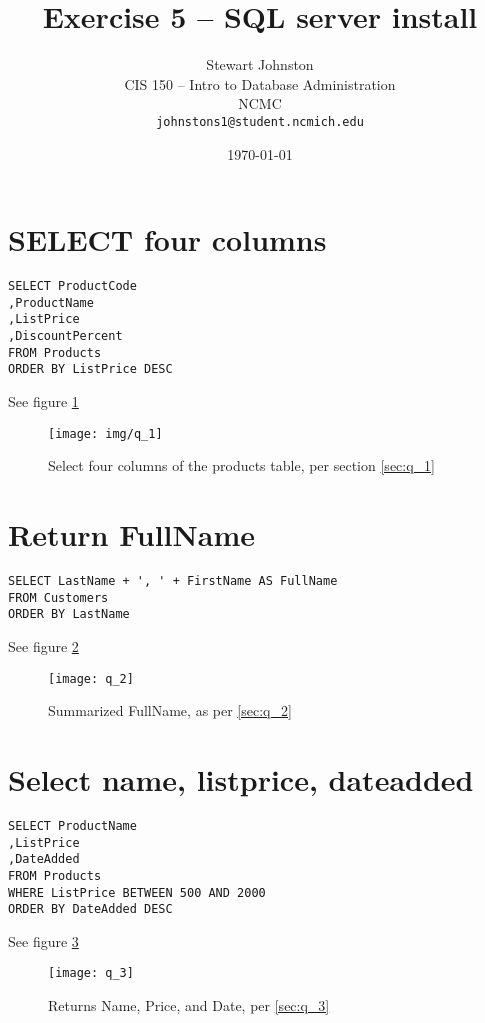 \documentclass{article}
\title{Exercise 5 -- SQL server install}
\author{Stewart Johnston\\
  {CIS 150 -- Intro to Database Administration}\\
  {NCMC}\\
  {\texttt{johnstons1@student.ncmich.edu}}
}
\date{\today}
\begin{document}
\maketitle
\lstset{language=SQL}

\section{SELECT four columns}

\begin{lstlisting}
SELECT ProductCode
,ProductName
,ListPrice
,DiscountPercent
FROM Products
ORDER BY ListPrice DESC
\end{lstlisting}\label{sec:q_1}
See figure \ref{fig:q_1}

\begin{figure}[H]\centering
	\caption{Select four columns of the products table, per section
	\ref{sec:q_1}}
	\texttt{[image: img/q\_1]}
	\label{fig:q_1}
\end{figure}

\section{Return FullName}

\begin{lstlisting}
SELECT LastName + ', ' + FirstName AS FullName
FROM Customers
ORDER BY LastName
\end{lstlisting}\label{sec:q_2}
See figure \ref{fig:q_2}

\begin{figure}[H]\centering
	\caption{Summarized FullName, as per \ref{sec:q_2}}
	\texttt{[image: q\_2]}
	\label{fig:q_2}
\end{figure}

\section{Select name, listprice, dateadded}

\begin{lstlisting}
SELECT ProductName
,ListPrice
,DateAdded
FROM Products
WHERE ListPrice BETWEEN 500 AND 2000
ORDER BY DateAdded DESC
\end{lstlisting}\label{sec:q_3}
See figure \ref{fig:q_3}

\begin{figure}[H]\centering
	\caption{Returns Name, Price, and Date, per \ref{sec:q_3}}
	\texttt{[image: q\_3]}
	\label{fig:q_3}
\end{figure}
\end{document}
